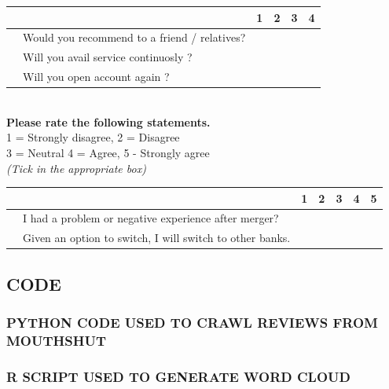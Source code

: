 \documentclass[a4paper, 12pt]{extarticle}
\newcounter{magicrownumbers}
\newcommand\rownumber{\stepcounter{magicrownumbers}\arabic{magicrownumbers}}
\newcommand\tab[1][1cm]{\hspace*{#1}}
\begin{document}
{\begin{minipage}{\textwidth}
\begin{tabularx}{\linewidth}{|l|l|X|X|X|X|}
\hline \multicolumn{2}{|c|}{} & 1 & 2 & 3 & 4\\
\hline \rownumber & Would you recommend to a friend / relatives? & \tab & \tab & \tab & \tab \\
\hline \rownumber & Will you avail service continuosly ?& \tab & \tab & \tab & \tab \\
\hline \rownumber & Will you open account again ? & \tab & \tab & \tab & \tab \\
\hline
\end{tabularx}

\end{minipage}
\tab \\
\textbf{Please rate the following statements.}\\
1 = Strongly disagree, 2 = Disagree \\
3 = Neutral
4 = Agree, 5 - Strongly agree\\
\emph {(Tick in the appropriate box)}\\
\begin{minipage}{\textwidth}

\begin{tabularx}{\linewidth}{|l|l|X|X|X|X|X|}
\hline \multicolumn{2}{|c|}{} & 1 & 2 & 3 & 4 & 5\\
\hline \rownumber & I had a problem or negative experience after merger? & \tab & \tab & \tab & \tab & \tab \\
\hline \rownumber & Given an option to switch, I will switch to other banks. & \tab & \tab & \tab & \tab & \tab \\
\hline
\end{tabularx}

\end{minipage}
\newpage
\subsection{CODE}
\subsubsection{PYTHON CODE USED TO CRAWL REVIEWS FROM MOUTHSHUT}


\newpage
\subsubsection{R SCRIPT USED TO GENERATE WORD CLOUD}

\newpage
}
\end{document}
